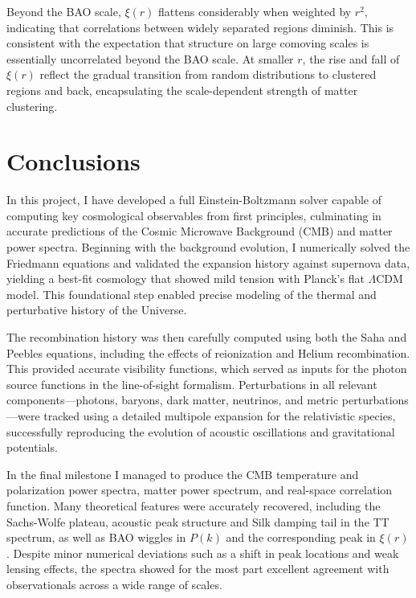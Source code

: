 \documentclass{aa}
\numberwithin{equation}{section}
\numberwithin{table}{section}
\numberwithin{figure}{section}
\begin{document}
Beyond the BAO scale, $\xi(r)$ flattens considerably when weighted by $r^2$, indicating that correlations between widely separated regions diminish. This is consistent with the expectation that structure on large comoving scales is essentially uncorrelated beyond the BAO scale. At smaller $r$, the rise and fall of $\xi(r)$ reflect the gradual transition from random distributions to clustered regions and back, encapsulating the scale-dependent strength of matter clustering.





\section{Conclusions}\label{sec: conclusions}

In this project, I have developed a full Einstein-Boltzmann solver capable of computing key cosmological observables from first principles, culminating in accurate predictions of the Cosmic Microwave Background (CMB) and matter power spectra. Beginning with the background evolution, I numerically solved the Friedmann equations and validated the expansion history against supernova data, yielding a best-fit cosmology that showed mild tension with Planck's flat $\Lambda$CDM model. This foundational step enabled precise modeling of the thermal and perturbative history of the Universe.

The recombination history was then carefully computed using both the Saha and Peebles equations, including the effects of reionization and Helium recombination. This provided accurate visibility functions, which served as inputs for the photon source functions in the line-of-sight formalism. Perturbations in all relevant components—photons, baryons, dark matter, neutrinos, and metric perturbations—were tracked using a detailed multipole expansion for the relativistic species, successfully reproducing the evolution of acoustic oscillations and gravitational potentials.

In the final milestone I managed to produce the CMB temperature and polarization power spectra, matter power spectrum, and real-space correlation function. Many theoretical features were accurately recovered, including the Sachs-Wolfe plateau, acoustic peak structure and Silk damping tail in the TT spectrum, as well as BAO wiggles in $P(k)$ and the corresponding peak in $\xi(r)$. Despite minor numerical deviations such as a shift in peak locations and weak lensing effects, the spectra showed for the most part excellent agreement with observationals across a wide range of scales.
\end{document}
